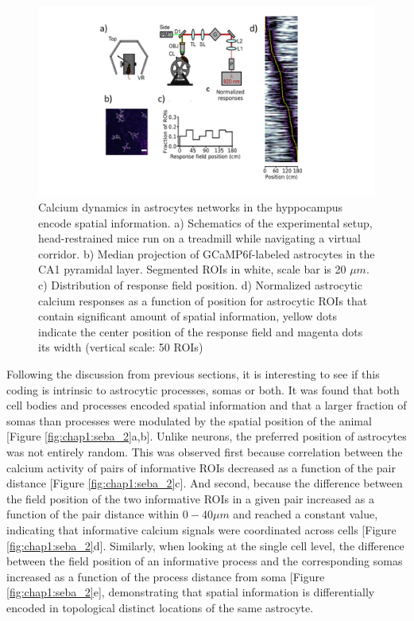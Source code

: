 \begin{figure}
    \centering
    \includegraphics[trim={150 50 200 0},clip,width=\textwidth]{Figures/Chapter1/intro_fig_seba_1.pdf}
    \caption{Calcium dynamics in astrocytes networks in the hyppocampus encode spatial information. a) Schematics of the experimental setup, head-restrained mice run on a treadmill while navigating a virtual corridor. b) Median projection of GCaMP6f-labeled astrocytes in the CA1 pyramidal layer. Segmented ROIs in white, scale bar is 20 $\mu m$. c) Distribution of response field position. d) Normalized astrocytic calcium responses as a function of position for astrocytic ROIs that contain significant amount of spatial information, yellow dots indicate the center position of the response field and magenta dots its width (vertical scale: 50 ROIs)}
    \label{fig:chap1:seba_1}
\end{figure}
Following the discussion from previous sections, it is interesting to see if this coding is intrinsic to astrocytic processes, somas or both. 
It was found that both cell bodies and processes encoded spatial information and that a larger fraction of somas than processes were modulated by the spatial position of the animal [Figure \ref{fig:chap1:seba_2}a,b].
Unlike neurons, the preferred position of astrocytes was not entirely random.
This was observed first because correlation between the calcium activity of pairs of informative ROIs decreased as a function of the pair distance [Figure \ref{fig:chap1:seba_2}c].
And second, because the difference between the field position of the two informative ROIs in a given pair increased as a function of the pair distance within $0-40 \mu m$ and reached a constant value, indicating that informative calcium signals were coordinated across cells [Figure \ref{fig:chap1:seba_2}d].
Similarly, when looking at the single cell level, the difference between the field position of an informative process and the corresponding somas increased as a function of the process distance from soma [Figure \ref{fig:chap1:seba_2}e], demonstrating that spatial information is differentially encoded in topological distinct locations of the same astrocyte. 

